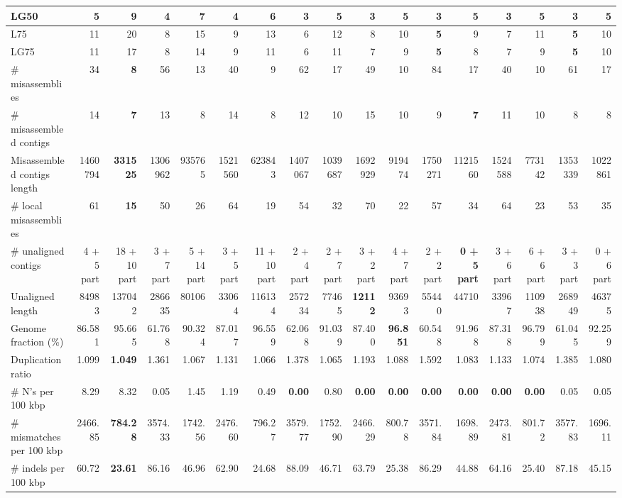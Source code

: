 \documentclass[12pt,a4paper]{article}
\begin{document}
\begin{table}[ht]
\begin{center}
\begin{tabular}{|l*{16}{|r}|}
LG50 & 5 & 9 & 4 & 7 & 4 & 6 & {\bf 3} & 5 & {\bf 3} & 5 & {\bf 3} & 5 & {\bf 3} & 5 & {\bf 3} & 5 \\ \hline
L75 & 11 & 20 & 8 & 15 & 9 & 13 & 6 & 12 & 8 & 10 & {\bf 5} & 9 & 7 & 11 & {\bf 5} & 10 \\ \hline
LG75 & 11 & 17 & 8 & 14 & 9 & 11 & 6 & 11 & 7 & 9 & {\bf 5} & 8 & 7 & 9 & {\bf 5} & 10 \\ \hline
\# misassemblies & 34 & {\bf 8} & 56 & 13 & 40 & 9 & 62 & 17 & 49 & 10 & 84 & 17 & 40 & 10 & 61 & 17 \\ \hline
\# misassembled contigs & 14 & {\bf 7} & 13 & 8 & 14 & 8 & 12 & 10 & 15 & 10 & 9 & {\bf 7} & 11 & 10 & 8 & 8 \\ \hline
Misassembled contigs length & 1460794 & {\bf 331525} & 1306962 & 935765 & 1521560 & 623843 & 1407067 & 1039687 & 1692929 & 919474 & 1750271 & 1121560 & 1524588 & 773142 & 1353339 & 1022861 \\ \hline
\# local misassemblies & 61 & {\bf 15} & 50 & 26 & 64 & 19 & 54 & 32 & 70 & 22 & 57 & 34 & 64 & 23 & 53 & 35 \\ \hline
\# unaligned contigs & 4 + 5 part & 18 + 10 part & 3 + 7 part & 5 + 14 part & 3 + 5 part & 11 + 10 part & 2 + 4 part & 2 + 7 part & 3 + 2 part & 4 + 7 part & 2 + 2 part & {\bf 0 + 5 part} & 3 + 6 part & 6 + 6 part & 3 + 3 part & 0 + 6 part \\ \hline
Unaligned length & 84983 & 137042 & 286635 & 80106 & 33064 & 116134 & 257234 & 77465 & {\bf 12112} & 93693 & 55440 & 44710 & 33967 & 110938 & 268949 & 46375 \\ \hline
Genome fraction (\%) & 86.581 & 95.665 & 61.768 & 90.324 & 87.017 & 96.559 & 62.068 & 91.039 & 87.400 & {\bf 96.851} & 60.548 & 91.968 & 87.318 & 96.799 & 61.045 & 92.259 \\ \hline
Duplication ratio & 1.099 & {\bf 1.049} & 1.361 & 1.067 & 1.131 & 1.066 & 1.378 & 1.065 & 1.193 & 1.088 & 1.592 & 1.083 & 1.133 & 1.074 & 1.385 & 1.080 \\ \hline
\# N's per 100 kbp & 8.29 & 8.32 & 0.05 & 1.45 & 1.19 & 0.49 & {\bf 0.00} & 0.80 & {\bf 0.00} & {\bf 0.00} & {\bf 0.00} & {\bf 0.00} & {\bf 0.00} & {\bf 0.00} & 0.05 & 0.05 \\ \hline
\# mismatches per 100 kbp & 2466.85 & {\bf 784.28} & 3574.33 & 1742.56 & 2476.60 & 796.27 & 3579.77 & 1752.90 & 2466.29 & 800.78 & 3571.84 & 1698.89 & 2473.81 & 801.72 & 3577.83 & 1696.11 \\ \hline
\# indels per 100 kbp & 60.72 & {\bf 23.61} & 86.16 & 46.96 & 62.90 & 24.68 & 88.09 & 46.71 & 63.79 & 25.38 & 86.29 & 44.88 & 64.16 & 25.40 & 87.18 & 45.15 \\ \hline

\end{tabular}
\end{center}
\end{table}
\end{document}
